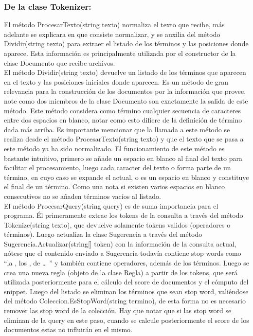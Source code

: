 \documentclass{article}
\begin{document}
\subsubsection{De la clase Tokenizer:}
El método ProcesarTexto(string texto) normaliza el texto que recibe, más adelante se explicara en que consiste normalizar, y se auxilia del método Dividir(string texto) para extraer el listado de los términos y las posiciones donde aparece. Esta información es principalmente utilizada por el constructor de la clase Documento que recibe archivos.\\
El método Dividir(string texto) devuelve un listado de los términos que aparecen en el texto y las posiciones iniciales donde aparecen. Es un método de gran relevancia para la construcción de los documentos por la información que provee, note como dos miembros de la clase Documento son exactamente la salida de este método. Este método considera como término cualquier secuencia de caracteres entre dos espacios en blanco, notar como esto difiere de la definición de término dada más arriba. Es importante mencionar que la llamada a este método se realiza desde el método ProcesarTexto(string texto) y que el texto que se pasa a este método ya ha sido normalizado. El funcionamiento de este método es bastante intuitivo, primero se añade un espacio en blanco al final del texto para facilitar el procesamiento, luego cada caracter del texto o forma parte de un término, en cuyo caso se expande el actual, o es un espacio en blanco y constituye el final de un término. Como una nota si existen varios espacios en blanco consecutivos no se añaden términos vacíos al listado.\\
El método ProcesarQuery(string query) es de suma importancia para el programa. Él primeramente extrae los tokens de la consulta a través del método Tokenize(string texto), que devuelve solamente tokens validos (operadores o términos). Luego actualiza la clase Sugerencia a través del método Sugerencia.Actualizar(string[] token) con la información de la consulta actual, nótese que el contenido enviado a Sugerencia todavía contiene stop words como “la , los , de … ” y también contiene operadores, además de los términos. Luego se crea una nueva regla (objeto de la clase Regla) a partir de los tokens, que será utilizada posteriormente para el cálculo del score de documentos y el cómputo del snippet. Luego del listado se eliminan los términos que sean stop word, valiéndose del método Coleccion.EsStopWord(string termino), de esta forma no es necesario remover las stop word de la colección. Hay que notar que si las stop word se eliminan de la query en este paso, cuando se calcule posteriormente el score de los documentos estas no influirán en el mismo. \\
\end{document}
